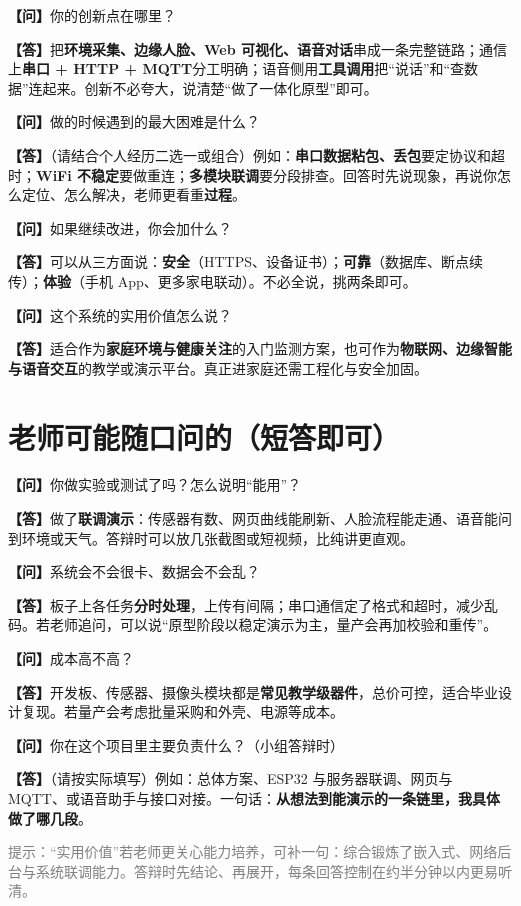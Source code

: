 \documentclass[11pt,a4paper]{ctexart}
\newcommand{\答辩问}[1]{\par\noindent\textbf{\color{QColor}【问】}#1\par\vspace{0.35em}}
\newcommand{\答辩答}[1]{\noindent\textbf{【答】}#1\par}
\begin{document}
\begin{qabox}
\答辩问{你的创新点在哪里？}
\答辩答{把\textbf{环境采集、边缘人脸、Web 可视化、语音对话}串成一条完整链路；通信上\textbf{串口 + HTTP + MQTT}分工明确；语音侧用\textbf{工具调用}把``说话''和``查数据''连起来。创新不必夸大，说清楚``做了一体化原型''即可。}
\end{qabox}

\begin{qabox}
\答辩问{做的时候遇到的最大困难是什么？}
\答辩答{（请结合个人经历二选一或组合）例如：\textbf{串口数据粘包、丢包}要定协议和超时；\textbf{WiFi 不稳定}要做重连；\textbf{多模块联调}要分段排查。回答时先说现象，再说你怎么定位、怎么解决，老师更看重\textbf{过程}。}
\end{qabox}

\begin{qabox}
\答辩问{如果继续改进，你会加什么？}
\答辩答{可以从三方面说：\textbf{安全}（HTTPS、设备证书）；\textbf{可靠}（数据库、断点续传）；\textbf{体验}（手机 App、更多家电联动）。不必全说，挑两条即可。}
\end{qabox}

\begin{qabox}
\答辩问{这个系统的实用价值怎么说？}
\答辩答{适合作为\textbf{家庭环境与健康关注}的入门监测方案，也可作为\textbf{物联网、边缘智能与语音交互}的教学或演示平台。真正进家庭还需工程化与安全加固。}
\end{qabox}

\section{老师可能随口问的（短答即可）}

\begin{qabox}
\答辩问{你做实验或测试了吗？怎么说明``能用''？}
\答辩答{做了\textbf{联调演示}：传感器有数、网页曲线能刷新、人脸流程能走通、语音能问到环境或天气。答辩时可以放几张截图或短视频，比纯讲更直观。}
\end{qabox}

\begin{qabox}
\答辩问{系统会不会很卡、数据会不会乱？}
\答辩答{板子上各任务\textbf{分时处理}，上传有间隔；串口通信定了格式和超时，减少乱码。若老师追问，可以说``原型阶段以稳定演示为主，量产会再加校验和重传''。}
\end{qabox}

\begin{qabox}
\答辩问{成本高不高？}
\答辩答{开发板、传感器、摄像头模块都是\textbf{常见教学级器件}，总价可控，适合毕业设计复现。若量产会考虑批量采购和外壳、电源等成本。}
\end{qabox}

\begin{qabox}
\答辩问{你在这个项目里主要负责什么？（小组答辩时）}
\答辩答{（请按实际填写）例如：总体方案、ESP32 与服务器联调、网页与 MQTT、或语音助手与接口对接。一句话：\textbf{从想法到能演示的一条链里，我具体做了哪几段}。}
\end{qabox}

\vspace{1em}
\noindent\textcolor{gray}{\small 提示：``实用价值''若老师更关心能力培养，可补一句：综合锻炼了嵌入式、网络后台与系统联调能力。答辩时先结论、再展开，每条回答控制在约半分钟以内更易听清。}
\end{document}
